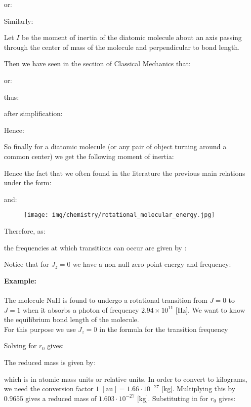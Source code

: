 	or:
	
	Similarly:
	
	Let $I$ be the moment of inertia of the diatomic molecule about an axis passing through the center of mass of the molecule and perpendicular to bond length.

	Then we have seen in the section of Classical Mechanics that:
	
	or:
	
	thus:
	
	after simplification:
	
	Hence:
	
	So finally for a diatomic molecule (or any pair of object turning around a common center) we get the following moment of inertia:
	
	Hence the fact that we often found in the literature the previous main relations under the form:
	
	and:
	
	\begin{figure}[H]
		\centering
		\texttt{[image: img/chemistry/rotational\_molecular\_energy.jpg]}
	\end{figure}
	Therefore, as: 
	
	the frequencies at which transitions can occur are given by :
	
	Notice that for $J_z=0$ we have a non-null zero point energy and frequency:
	
	
	\begin{tcolorbox}[colframe=black,colback=white,sharp corners]
	\textbf{{\Large {}}Example:}\\\\
	The molecule $\mathrm{NaH}$ is found to undergo a rotational transition from  $J=0$ to $J=1$ when it absorbs a photon of frequency $2.94 \times 10^{11}$ [Hz]. We want to know the equilibrium bond length of the molecule.\\

	For this purpose we use $J_z=0$ in the formula for the transition frequency 
	
	Solving for $r_0$ gives:
	
	The reduced mass is given by:
	
	which is in atomic mass units or relative units. In order to convert to kilograms, we need the conversion factor $1\;[\text{au}]= 1.66\cdot 10^{-27}$ [kg]. Multiplying this by $0.9655$ gives a reduced mass of $1.603\cdot 10^{-27}$ [kg]. Substituting in for $r_0$ gives:
	
	\end{tcolorbox}


